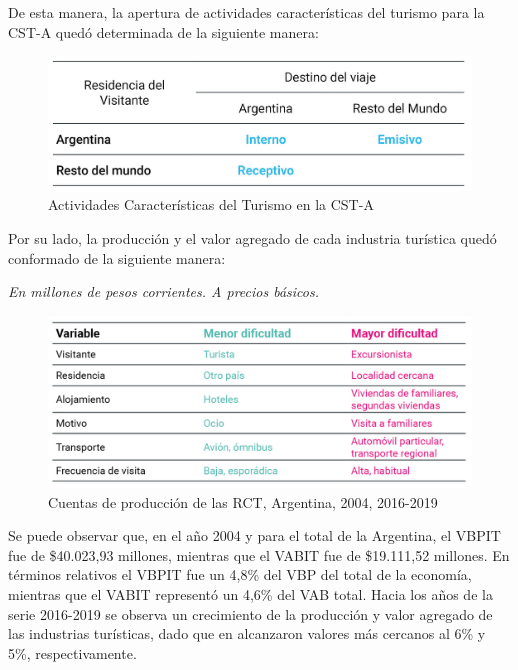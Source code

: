 \documentclass[
  openany]{book}
\begin{document}
De esta manera, la apertura de actividades características del turismo para la CST-A quedó determinada de la siguiente manera:

\begin{figure}

{\centering \includegraphics[width=0.8\linewidth]{imagenes/figura1.3} 

}

\caption{Actividades Características del Turismo en la CST-A}\label{fig:activcst}
\end{figure}

Por su lado, la producción y el valor agregado de cada industria turística quedó conformado de la siguiente manera:

\emph{En millones de pesos corrientes. A precios básicos.}

\begin{figure}

{\centering \includegraphics[width=0.8\linewidth]{imagenes/figura1.4} 

}

\caption{Cuentas de producción de las RCT, Argentina, 2004, 2016-2019}\label{fig:cst}
\end{figure}

Se puede observar que, en el año 2004 y para el total de la Argentina, el VBPIT fue de \$40.023,93 millones, mientras que el VABIT fue de \$19.111,52 millones. En términos relativos el VBPIT fue un 4,8\% del VBP del total de la economía, mientras que el VABIT representó un 4,6\% del VAB total. Hacia los años de la serie 2016-2019 se observa un crecimiento de la producción y valor agregado de las industrias turísticas, dado que en alcanzaron valores más cercanos al 6\% y 5\%, respectivamente.
\end{document}
